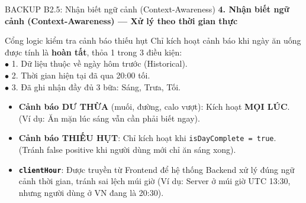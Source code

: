 \documentclass[10pt, aspectratio=169]{beamer}
\begin{document}
\begin{frame}[fragile, label=b2_5]{BACKUP B2.5: Nhận biết ngữ cảnh (Context-Awareness)}
\hypertarget{b2_5_target}{}
    \textbf{4. Nhận biết ngữ cảnh (Context-Awareness) — Xử lý theo thời gian thực}
    \vspace{0.1cm}
    
    \begin{block}{\small Cổng logic kiểm tra cảnh báo thiếu hụt}
        \footnotesize
        Chỉ kích hoạt cảnh báo khi ngày ăn uống được tính là \textbf{hoàn tất}, thỏa 1 trong 3 điều kiện:\\
        $\bullet$ 1. Dữ liệu thuộc về ngày hôm trước (Historical).\\
        $\bullet$ 2. Thời gian hiện tại đã qua 20:00 tối.\\
        $\bullet$ 3. Đã ghi nhận đầy đủ 3 bữa: Sáng, Trưa, Tối.
    \end{block}
    
    \begin{itemize}
        \small
        \item \textbf{Cảnh báo DƯ THỪA} (muối, đường, calo vượt): Kích hoạt \textbf{MỌI LÚC}. (Ví dụ: Ăn mặn lúc sáng vẫn cần phải biết ngay).
        \item \textbf{Cảnh báo THIẾU HỤT}: Chỉ kích hoạt khi \texttt{isDayComplete = true}. (Tránh false positive khi người dùng mới chỉ ăn sáng xong).
        \item \textbf{\texttt{clientHour}}: Được truyền từ Frontend để hệ thống Backend xử lý đúng ngữ cảnh thời gian, tránh sai lệch múi giờ (Ví dụ: Server ở múi giờ UTC 13:30, nhưng người dùng ở VN đang là 20:30).
    \end{itemize}
\end{frame}
\end{document}
